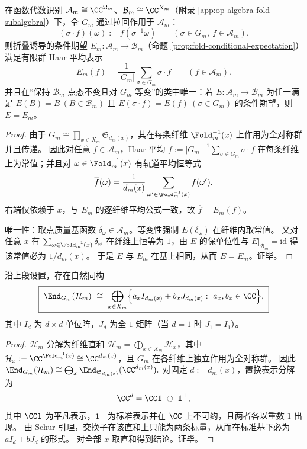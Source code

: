 \begin{theorem}\label{thm:op-algebra-fold-conditional-expectation-haar}
在函数代数识别 \(\mathcal A_m\cong\CC^{\Omega_m}\)、\(\mathcal B_m\cong\CC^{X_m}\)（附录 \ref{app:op-algebra-fold-subalgebra}）下，令 \(G_m\) 通过拉回作用于 \(\mathcal A_m\)：
\[
(\sigma\cdot f)(\omega):=f(\sigma^{-1}\omega)\qquad(\sigma\in G_m,\ f\in\mathcal A_m).
\]
则折叠诱导的条件期望 \(E_m:\mathcal A_m\to\mathcal B_m\)（命题 \ref{prop:fold-conditional-expectation}）满足有限群 Haar 平均表示
\[
\boxed{\;
E_m(f)=\frac{1}{|G_m|}\sum_{\sigma\in G_m}\sigma\cdot f\qquad(f\in\mathcal A_m).\;}
\]
并且在“保持 \(\mathcal B_m\) 点态不变且对 \(G_m\) 等变”的类中唯一：若 \(E:\mathcal A_m\to\mathcal B_m\) 为任一满足
\(
E(B)=B\ (B\in\mathcal B_m)
\)
且
\(
E(\sigma\cdot f)=E(f)\ (\sigma\in G_m)
\)
的条件期望，则 \(E=E_m\)。
\end{theorem}
\begin{proof}
由于 \(G_m\cong\prod_{x\in X_m}\mathfrak S_{d_m(x)}\)，其在每条纤维 \(\Fold_m^{-1}(x)\) 上作用为全对称群并且传递。
因此对任意 \(f\in\mathcal A_m\)，Haar 平均
\(
\overline f:=|G_m|^{-1}\sum_{\sigma\in G_m}\sigma\cdot f
\)
在每条纤维上为常值；并且对 \(\omega\in\Fold_m^{-1}(x)\) 有轨道平均恒等式
\[
\overline f(\omega)=\frac{1}{d_m(x)}\sum_{\omega'\in\Fold_m^{-1}(x)}f(\omega').
\]
右端仅依赖于 \(x\)，与 \(E_m\) 的逐纤维平均公式一致，故 \(\overline f=E_m(f)\)。
\par
唯一性：取点质量基函数 \(\delta_\omega\in\mathcal A_m\)。等变性强制 \(E(\delta_\omega)\) 在纤维内取常值。
又对任意 \(x\) 有 \(\sum_{\omega\in\Fold_m^{-1}(x)}\delta_\omega\) 在纤维上恒等为 \(1\)，由 \(E\) 的保单位性与 \(E|_{\mathcal B_m}=\mathrm{id}\) 得该常值必为 \(1/d_m(x)\)。
于是 \(E\) 与 \(E_m\) 在基上相同，从而 \(E=E_m\)。证毕。
\end{proof}



\begin{theorem}\label{thm:op-algebra-fold-gauge-commutant-explicit}
沿上段设置，存在自然同构
\[
\boxed{\;
\End_{G_m}(\mathcal H_m)\ \cong\ \bigoplus_{x\in X_m}\Bigl\{a_x I_{d_m(x)}+b_x J_{d_m(x)}:\ a_x,b_x\in\CC\Bigr\},\;}
\]
其中 \(I_d\) 为 \(d\times d\) 单位阵，\(J_d\) 为全 \(1\) 矩阵（当 \(d=1\) 时 \(J_1=I_1\)）。
\end{theorem}
\begin{proof}
\(\mathcal H_m\) 分解为纤维直和 \(\mathcal H_m=\bigoplus_{x\in X_m}\mathcal H_x\)，其中 \(\mathcal H_x:=\CC^{\Fold_m^{-1}(x)}\cong \CC^{d_m(x)}\)，且 \(G_m\) 在各纤维上独立作用为全对称群。
因此
\(
\End_{G_m}(\mathcal H_m)\cong\bigoplus_x \End_{\mathfrak S_{d_m(x)}}(\CC^{d_m(x)}).
\)
对固定 \(d:=d_m(x)\)，置换表示分解为
\[
\CC^d=\CC\mathbf 1\ \oplus\ \mathbf 1^\perp,
\]
其中 \(\CC\mathbf 1\) 为平凡表示，\(\mathbf 1^\perp\) 为标准表示并在 \(\CC\) 上不可约，且两者各以重数 \(1\) 出现。
由 Schur 引理，交换子在该直和上只能为两条标量，从而在标准基下必为 \(aI_d+bJ_d\) 的形式。
对全部 \(x\) 取直和得到结论。证毕。
\end{proof}

